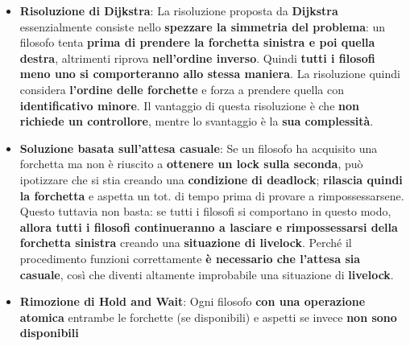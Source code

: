 \documentclass[12pt]{article}
\begin{document}
\begin{itemize}
    \item \textbf{Risoluzione di Dijkstra}: La risoluzione proposta da \textbf{Dijkstra} essenzialmente consiste nello \textbf{spezzare la simmetria del problema}: un filosofo tenta \textbf{prima di prendere la forchetta sinistra e poi quella destra}, altrimenti riprova \textbf{nell'ordine inverso}. Quindi \textbf{tutti i filosofi meno uno si comporteranno allo stessa maniera}. La risoluzione quindi considera \textbf{l'ordine delle forchette} e forza a prendere quella con \textbf{identificativo minore}. Il vantaggio di questa risoluzione è che \textbf{non richiede un controllore}, mentre lo svantaggio è la \textbf{sua complessità}.
    \item \textbf{Soluzione basata sull'attesa casuale}: Se un filosofo ha acquisito una forchetta ma non è riuscito a \textbf{ottenere un lock sulla seconda}, può ipotizzare che si stia creando una \textbf{condizione di deadlock}; \textbf{rilascia quindi la forchetta} e aspetta un tot. di tempo prima di provare a rimpossessarsene. Questo tuttavia non basta: se tutti i filosofi si comportano in questo modo, \textbf{allora tutti i filosofi continueranno a lasciare e rimpossessarsi della forchetta sinistra} creando una \textbf{situazione di livelock}. Perché il procedimento funzioni correttamente \textbf{è necessario che l'attesa sia casuale}, così che diventi altamente improbabile una situazione di \textbf{livelock}.
    \item \textbf{Rimozione di Hold and Wait}: Ogni filosofo \textbf{con una operazione atomica} entrambe le forchette (se disponibili) e aspetti se invece \textbf{non sono disponibili}
\end{itemize}
\end{document}

